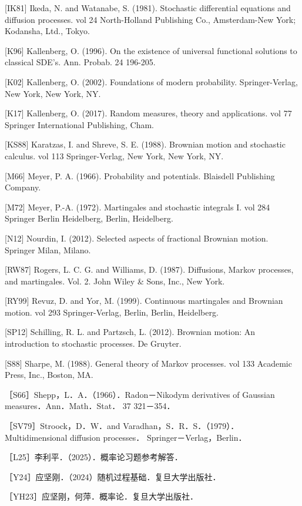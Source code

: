 [IK81] Ikeda, N. and Watanabe, S. (1981). Stochastic differential equations and diffusion processes. vol 24 North-Holland Publishing Co., Amsterdam-New York; Kodansha, Ltd., Tokyo.

[K96] Kallenberg, O. (1996). On the existence of universal functional solutions to classical SDE's. Ann. Probab. 24 196-205.

[K02] Kallenberg, O. (2002). Foundations of modern probability. Springer-Verlag, New York, New York, NY.

[K17] Kallenberg, O. (2017). Random measures, theory and applications. vol 77 Springer International Publishing, Cham.

[KS88] Karatzas, I. and Shreve, S. E. (1988). Brownian motion and stochastic calculus. vol 113 Springer-Verlag, New York, New York, NY.

[M66] Meyer, P. A. (1966). Probability and potentials. Blaisdell Publishing Company.

[M72] Meyer, P.-A. (1972). Martingales and stochastic integrals I. vol 284 Springer Berlin Heidelberg, Berlin, Heidelberg.

[N12] Nourdin, I. (2012). Selected aspects of fractional Brownian motion. Springer Milan, Milano.

[RW87] Rogers, L. C. G. and Williams, D. (1987). Diffusions, Markov processes, and martingales. Vol. 2. John Wiley \& Sons, Inc., New York.

[RY99] Revuz, D. and Yor, M. (1999). Continuous martingales and Brownian motion. vol 293 Springer-Verlag, Berlin, Berlin, Heidelberg.

[SP12] Schilling, R. L. and Partzsch, L. (2012). Brownian motion: An introduction to stochastic processes. De Gruyter.

[S88] Sharpe, M. (1988). General theory of Markov processes. vol 133 Academic Press, Inc., Boston, MA.

［S66］Shepp，L．A．（1966）．Radon－Nikodym derivatives of Gaussian measures．Ann．Math．Stat． 37 321－354．

［SV79］Stroock，D．W．and Varadhan，S．R．S．（1979）．Multidimensional diffusion processes． Springer－Verlag，Berlin．

［L25］李利平．（2025）．概率论习题参考解答．

［Y24］应坚刚．（2024）随机过程基础．复旦大学出版社．

［YH23］应坚刚，何萍．概率论．复旦大学出版社．
